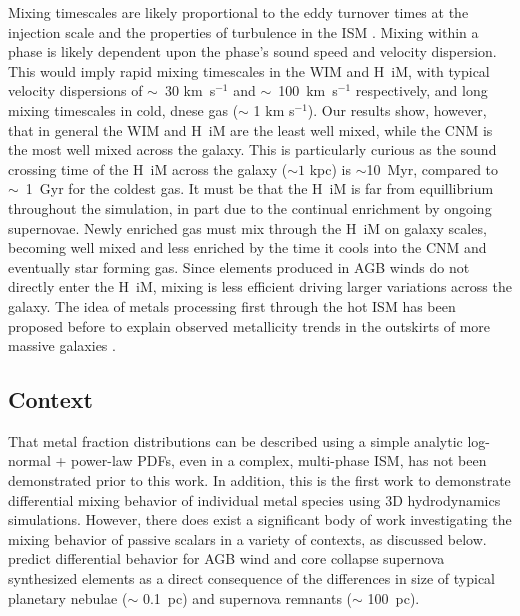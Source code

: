 \documentclass[twocolumn]{aastex61}
\begin{document}
%
%
Mixing timescales are likely proportional to the eddy turnover times at the injection scale \citep{PanScannapieco2010, Colbrook2017} and the properties of turbulence in the ISM \citep{YangKrumholz2012}. Mixing within a phase is likely dependent upon the phase's sound speed and velocity dispersion. This would imply rapid mixing timescales in the WIM and H~{\sc i}M, with typical velocity dispersions of $\sim$~30 km~s$^{-1}$ and $\sim$~100~km~s$^{-1}$ respectively, and long mixing timescales in cold, dnese gas ($\sim$ 1 km s$^{-1}$). Our results show, however, that in general the WIM and H~{\sc i}M are the least well mixed, while the CNM is the most well mixed across the galaxy. This is particularly curious as the sound crossing time of the H~{\sc i}M across the galaxy ($\sim 1$ kpc) is $\sim$10~Myr, compared to $\sim$~1~Gyr for the coldest gas. It must be that the H~{\sc i}M is far from equillibrium throughout the simulation, in part due to the continual enrichment by ongoing supernovae. Newly enriched gas must mix through the H~{\sc i}M on galaxy scales, becoming well mixed and less enriched by the time it cools into the CNM and eventually star forming gas. Since elements produced in AGB winds do not directly enter the H~{\sc i}M, mixing is less efficient driving larger variations across the galaxy. The idea of metals processing first through the hot ISM has been proposed before to explain observed metallicity trends in the outskirts of more massive galaxies \citep{Tassis2008,Werk2011}.

\subsection{Context}
\label{sec:context}
That metal fraction distributions can be described using a simple analytic log-normal + power-law PDFs, even in a complex, multi-phase ISM, has not been demonstrated prior to this work.   In addition, this is the first work to demonstrate differential mixing behavior of individual metal species using 3D hydrodynamics simulations. However, there does exist a significant body of work investigating the mixing behavior of passive scalars in a variety of contexts, as discussed below. \cite{KrumholzTing2018} predict differential behavior for AGB wind and core collapse supernova synthesized elements as a direct consequence of the differences in size of typical planetary nebulae ($\sim$ 0.1~pc) and supernova remnants ($\sim$ 100~pc).
\end{document}
